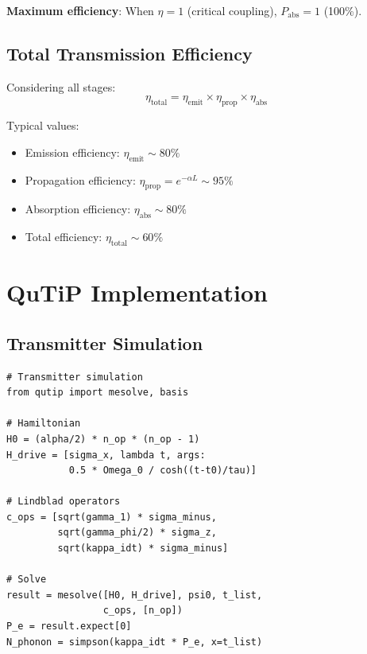 \documentclass[12pt,a4paper]{article}
\theoremstyle{definition}
\begin{document}
\textbf{Maximum efficiency}: When $\eta = 1$ (critical coupling), $P_{\text{abs}} = 1$ (100\%).

\subsection{Total Transmission Efficiency}

Considering all stages:
\begin{equation}
\eta_{\text{total}} = \eta_{\text{emit}}\times\eta_{\text{prop}}\times\eta_{\text{abs}}
\end{equation}

Typical values:
\begin{itemize}
\item Emission efficiency: $\eta_{\text{emit}} \sim 80\%$
\item Propagation efficiency: $\eta_{\text{prop}} = e^{-\alpha L} \sim 95\%$
\item Absorption efficiency: $\eta_{\text{abs}} \sim 80\%$
\item Total efficiency: $\eta_{\text{total}} \sim 60\%$
\end{itemize}

\section{QuTiP Implementation}

\subsection{Transmitter Simulation}

\begin{verbatim}
# Transmitter simulation
from qutip import mesolve, basis

# Hamiltonian
H0 = (alpha/2) * n_op * (n_op - 1)
H_drive = [sigma_x, lambda t, args: 
           0.5 * Omega_0 / cosh((t-t0)/tau)]

# Lindblad operators
c_ops = [sqrt(gamma_1) * sigma_minus,
         sqrt(gamma_phi/2) * sigma_z,
         sqrt(kappa_idt) * sigma_minus]

# Solve
result = mesolve([H0, H_drive], psi0, t_list, 
                 c_ops, [n_op])
P_e = result.expect[0]
N_phonon = simpson(kappa_idt * P_e, x=t_list)
\end{verbatim}
\end{document}
